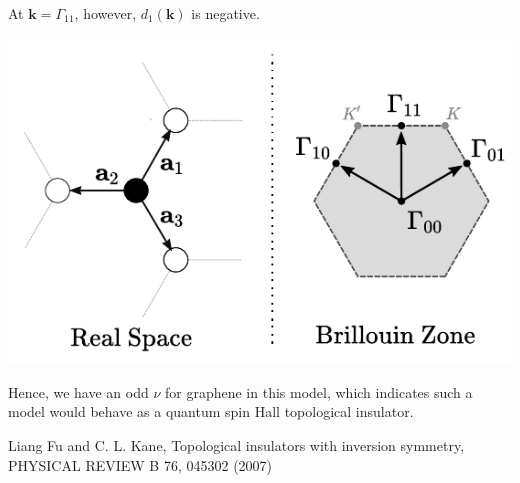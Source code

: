 \documentclass[10pt,a4paper]{article}\usepackage[]{graphicx}\usepackage[]{color}
\begin{document}
\begin{multicols}{2}
At $\mathbf{k}=\Gamma_{11}$, however, $d_1(\mathbf{k})$ is negative.
\begin{center}
\includegraphics[scale=0.8]{gampts.pdf} 
\end{center}
Hence, we have an odd $\nu$ for graphene in this model, which indicates such a model would behave as a quantum spin Hall topological insulator.
\end{multicols}

\begin{thebibliography}{2}

 Liang Fu and C. L. Kane, Topological insulators with inversion symmetry, PHYSICAL REVIEW B 76, 045302 (2007)
\end{thebibliography}
\end{document}
